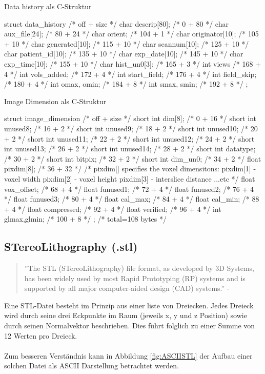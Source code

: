 \begin{program}
	\caption{Data history als C-Struktur \citep{AnalyzeFormat}}
	\label{prog:dataHist}
	\begin{CCode}
struct data_history
{ /* off + size */
	char descrip[80]; /* 0 + 80 */
	char aux_file[24]; /* 80 + 24 */
	char orient; /* 104 + 1 */
	char originator[10]; /* 105 + 10 */
	char generated[10]; /* 115 + 10 */
	char scannum[10]; /* 125 + 10 */
	char patient_id[10]; /* 135 + 10 */
	char exp_date[10]; /* 145 + 10 */
	char exp_time[10]; /* 155 + 10 */
	char hist_un0[3]; /* 165 + 3 */
	int views /* 168 + 4 */
	int vols_added; /* 172 + 4 */
	int start_field; /* 176 + 4 */
	int field_skip; /* 180 + 4 */
	int omax, omin; /* 184 + 8 */
	int smax, smin; /* 192 + 8 */
}; 
	\end{CCode}
\end{program}

\begin{program}[H]
	\caption{Image Dimension als C-Struktur \citep{AnalyzeFormat}}
	\label{prog:imageDim}
	\begin{CCode}
struct image_dimension
{ /* off + size */
	short int dim[8]; /* 0 + 16 */
	short int unused8; /* 16 + 2 */
	short int unused9; /* 18 + 2 */
	short int unused10; /* 20 + 2 */
	short int unused11; /* 22 + 2 */
	short int unused12; /* 24 + 2 */
	short int unused13; /* 26 + 2 */
	short int unused14; /* 28 + 2 */
	short int datatype; /* 30 + 2 */
	short int bitpix; /* 32 + 2 */
	short int dim_un0; /* 34 + 2 */
	float pixdim[8]; /* 36 + 32 */
	/*
	pixdim[] specifies the voxel dimensitons:
	pixdim[1] - voxel width
	pixdim[2] - voxel height
	pixdim[3] - interslice distance
	...etc
	*/
	float vox_offset; /* 68 + 4 */
	float funused1; /* 72 + 4 */
	float funused2; /* 76 + 4 */
	float funused3; /* 80 + 4 */
	float cal_max; /* 84 + 4 */
	float cal_min; /* 88 + 4 */
	float compressed; /* 92 + 4 */
	float verified; /* 96 + 4 */
	int glmax,glmin; /* 100 + 8 */
}; /* total=108 bytes */ 
	\end{CCode}
\end{program}

\subsection{STereoLithography (.stl)}
\begin{quote}
	''The STL (STereoLithography) file format, as developed by 3D Systems, has been widely used by most Rapid Prototyping (RP) systems and is supported by all major computer-aided design (CAD) systems.'' - \citep{STereoLithography}
\end{quote}
Eine STL-Datei besteht im Prinzip aus einer liste von Dreiecken. Jedes Dreieck wird durch seine drei Eckpunkte im Raum (jeweils x, y und z Position) sowie durch seinen Normalvektor beschrieben. Dies führt folglich zu einer Summe von 12 Werten pro Dreieck.\\
\\
Zum besseren Verständnis kann in Abbildung \ref{fig:ASCIISTL} der Aufbau einer solchen Datei als ASCII Darstellung betrachtet werden. 

